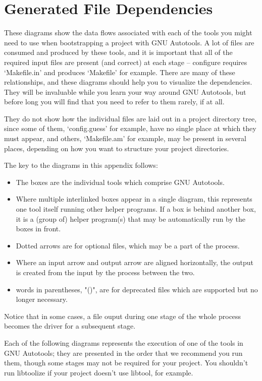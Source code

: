 \chapter{Generated File Dependencies}

These diagrams show the data flows associated with each of the tools you might need to use when bootstrapping a project with GNU Autotools. A lot of files are consumed and produced by these tools, and it is important that all of the required input files are present (and correct) at each stage -- configure requires `Makefile.in' and produces `Makefile' for example. There are many of these relationships, and these diagrams should help you to visualize the dependencies. They will be invaluable while you learn your way around GNU Autotools, but before long you will find that you need to refer to them rarely, if at all.

They do not show how the individual files are laid out in a project directory tree, since some of them, `config.guess' for example, have no single place at which they must appear, and others, `Makefile.am' for example, may be present in several places, depending on how you want to structure your project directories.

The key to the diagrams in this appendix follows: 

\begin{itemize}
\item The boxes are the individual tools which comprise GNU Autotools.
\item Where multiple interlinked boxes appear in a single diagram, this represents one tool itself running other helper programs. If a box is behind another box, it is a (group of) helper program(s) that may be automatically run by the boxes in front.
\item Dotted arrows are for optional files, which may be a part of the process.
\item Where an input arrow and output arrow are aligned horizontally, the output is created from the input by the process between the two.
\item words in parentheses, "()", are for deprecated files which are supported but no longer necessary.
\end{itemize}

Notice that in some cases, a file ouput during one stage of the whole process becomes the driver for a subsequent stage.

Each of the following diagrams represents the execution of one of the tools in GNU Autotools; they are presented in the order that we recommend you run them, though some stages may not be required for your project. You shouldn't run libtoolize if your project doesn't use libtool, for example. 

